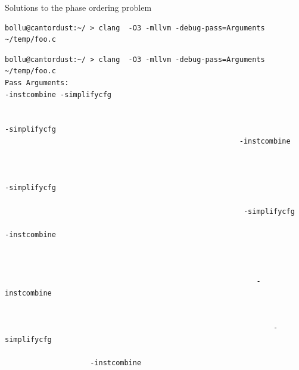 \documentclass[8pt]{beamer}
\begin{document}
\begin{frame}[fragile]{Solutions to the phase ordering problem}
\begin{verbatim}
bollu@cantordust:~/ > clang  -O3 -mllvm -debug-pass=Arguments ~/temp/foo.c
\end{verbatim}
\begin{verbatim}
bollu@cantordust:~/ > clang  -O3 -mllvm -debug-pass=Arguments ~/temp/foo.c
Pass Arguments:                                               
-instcombine -simplifycfg                                                   
                                                                      
                                                                               
-simplifycfg                                                       
                                                       -instcombine
                                                                 
                                                                               
                                                                               
-simplifycfg                                                                 
                                                              
                                                        -simplifycfg          
                                                                           
-instcombine                                                             
                                                                        
                                                                              
                                                                            
                                                           -instcombine
                                                                           
                                                                              
                                                               -simplifycfg
                                                                
                    -instcombine                                      
                                                                       

\end{verbatim}
\end{frame}
\end{document}
